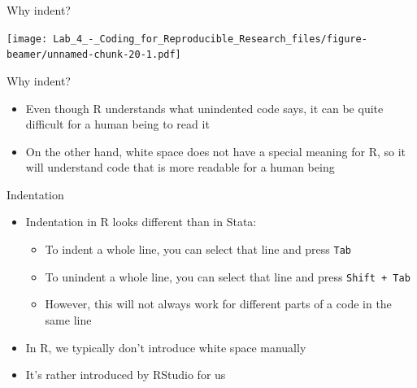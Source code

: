 \documentclass[ignorenonframetext,]{beamer}
\providecommand{\tightlist}{%
  \setlength{\itemsep}{0pt}\setlength{\parskip}{0pt}}
\begin{document}
\begin{frame}{Why indent?}

\texttt{[image: Lab\_4\_-\_Coding\_for\_Reproducible\_Research\_files/figure-beamer/unnamed-chunk-20-1.pdf]}

\end{frame}

\begin{frame}{Why indent?}

\begin{itemize}
\tightlist
\item
  Even though R understands what unindented code says, it can be quite
  difficult for a human being to read it
\item
  On the other hand, white space does not have a special meaning for R,
  so it will understand code that is more readable for a human being
\end{itemize}

\end{frame}

\begin{frame}{Indentation}

\begin{itemize}
    \item Indentation in R looks different than in Stata:
    \begin{itemize}
      \item To indent a whole line, you can select that line and press \texttt{Tab}
      \item To unindent a whole line, you can select that line and press \texttt{Shift + Tab}
      \item However, this will not always work for different parts of a code in the same line
    \end{itemize}
    \item In R, we typically don't introduce white space manually
    \item It's rather introduced by RStudio for us
  \end{itemize}

\end{frame}
\end{document}
